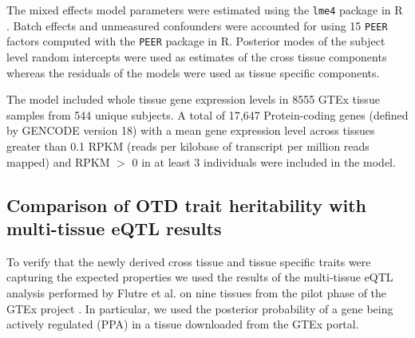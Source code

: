 \documentclass[10pt,letterpaper]{article}
\begin{document}

The mixed effects model parameters were estimated using the \texttt{lme4} package \cite{Bates_2015a} in R \cite{R_Core_Team_2015}. Batch effects and unmeasured confounders were accounted for using 15 \texttt{PEER} factors computed with the \texttt{PEER} \cite{Stegle_2012} package in R. Posterior modes of the subject level random intercepts were used as estimates of the cross tissue components whereas the residuals of the models were used as tissue specific components.

The model included whole tissue gene expression levels in 8555 GTEx
tissue samples from 544 unique subjects. A total of 17,647
Protein-coding genes (defined by GENCODE \cite{Harrow_2012} version 18) with a
mean gene expression level across tissues greater than 0.1 RPKM (reads
per kilobase of transcript per million reads mapped) and RPKM $>$ 0 in at least 3 individuals were included in
the model. 


\subsection*{Comparison of OTD trait heritability with multi-tissue eQTL
results}\label{comparison-of-otd-pve-to-multi-tissue-eqtl-results}

To verify that the newly derived cross tissue and tissue specific traits were capturing the expected properties we used the results of the multi-tissue eQTL analysis performed by Flutre et al. \cite{Flutre_2013}
on nine tissues from the pilot phase of the GTEx project \cite{Ardlie_2015}. %
In particular, we used the posterior probability of a gene being actively regulated (PPA) in a tissue downloaded from the GTEx portal.
\end{document}
